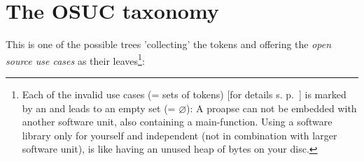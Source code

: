 \section{The OSUC taxonomy}

This is one of the possible trees 'collecting' the tokens and offering the
\emph{open source use cases} as their leaves\footnote{ Each of the invalid use
cases (= sets of tokens) [for details s. p.\
\pageref{InvalidFinderTokenCombinations}] is marked by an \lightning{} and leads
to an empty set (= $\varnothing$): A proapse can not be embedded with another
software unit, also containing a main-function. Using a software library only
for yourself and independent (not in combination with larger software unit), is
like having an unused heap of bytes on your disc.}:

\label{OsucDefinitionTree}
\begin{tiny}
\end{tiny}
